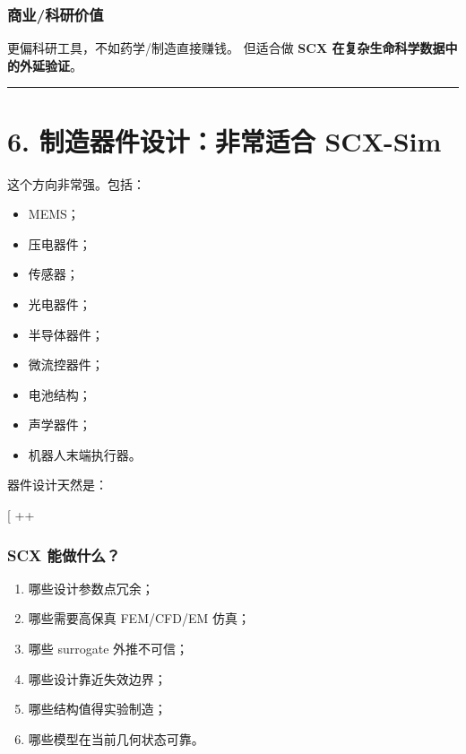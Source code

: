 \documentclass[
  12pt,
]{ctexart}
\providecommand{\tightlist}{%
  \setlength{\itemsep}{0pt}\setlength{\parskip}{0pt}}
\begin{document}
\subsubsection{商业/科研价值}\label{ux5546ux4e1aux79d1ux7814ux4ef7ux503c}

更偏科研工具，不如药学/制造直接赚钱。 但适合做 \textbf{SCX
在复杂生命科学数据中的外延验证}。

\begin{center}\rule{0.5\linewidth}{0.5pt}\end{center}

\section{6. 制造器件设计：非常适合
SCX-Sim}\label{ux5236ux9020ux5668ux4ef6ux8bbeux8ba1ux975eux5e38ux9002ux5408-scx-sim}

这个方向非常强。包括：

\begin{itemize}
\tightlist
\item
  MEMS；
\item
  压电器件；
\item
  传感器；
\item
  光电器件；
\item
  半导体器件；
\item
  微流控器件；
\item
  电池结构；
\item
  声学器件；
\item
  机器人末端执行器。
\end{itemize}

器件设计天然是：

{[} ++
\rightarrow {} \rightarrow \text{performance}{]}

\subsubsection{SCX 能做什么？}\label{scx-ux80fdux505aux4ec0ux4e48}

\begin{enumerate}
\def\labelenumi{\arabic{enumi}.}
\tightlist
\item
  哪些设计参数点冗余；
\item
  哪些需要高保真 FEM/CFD/EM 仿真；
\item
  哪些 surrogate 外推不可信；
\item
  哪些设计靠近失效边界；
\item
  哪些结构值得实验制造；
\item
  哪些模型在当前几何状态可靠。
\end{enumerate}
\end{document}
